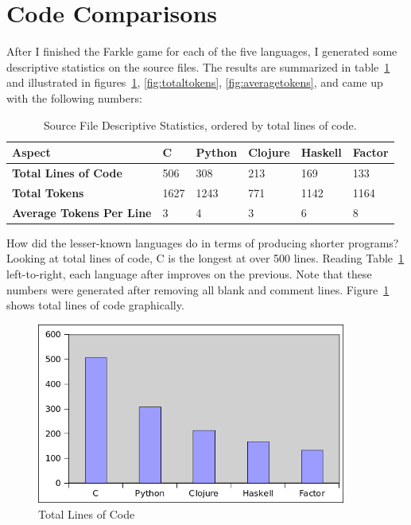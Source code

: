 \documentclass{article}
\begin{document}
\section{Code Comparisons}

After I finished the Farkle game for each of the five languages, I generated
some descriptive statistics on the source files.  The results are summarized in
table~\ref{tab:programcomparison} and illustrated in
figures~\ref{fig:totallines}, \ref{fig:totaltokens}, \ref{fig:averagetokens},
and came up with the following numbers:

\begin{table}[h]
    \caption{Source File Descriptive Statistics, ordered by total lines of code. \label{tab:programcomparison}}
    \begin{tabular}{|p{1.7in}|p{0.3in}|p{0.5in}|p{0.5in}|p{0.5in}|p{0.5in}|}
        \hline
        {\bf Aspect} & {\bf C} & {\bf Python} & {\bf Clojure} & {\bf Haskell} & {\bf Factor} \\
        \hline
        {\bf Total Lines of Code} & 506 & 308 & 213 & 169 & 133 \\
        \hline
        {\bf Total Tokens} & 1627 & 1243 & 771 & 1142 & 1164 \\
        \hline
        {\bf Average Tokens Per Line} & 3 & 4 & 3 & 6 & 8 \\
        \hline
    \end{tabular}
\end{table}

How did the lesser-known languages do in terms of producing shorter programs?
Looking at total lines of code, C is the longest at over 500 lines.  Reading
Table~\ref{tab:programcomparison} left-to-right, each language after improves on the previous.  Note that
these numbers were generated after removing all blank and comment lines.
Figure~\ref{fig:totallines} shows total lines of code graphically.

\begin{figure}[h]
    \centering
    \includegraphics[width=4in]{graphs/total-lines-of-code.png}
    \caption{Total Lines of Code \label{fig:totallines}}
\end{figure}
\end{document}
